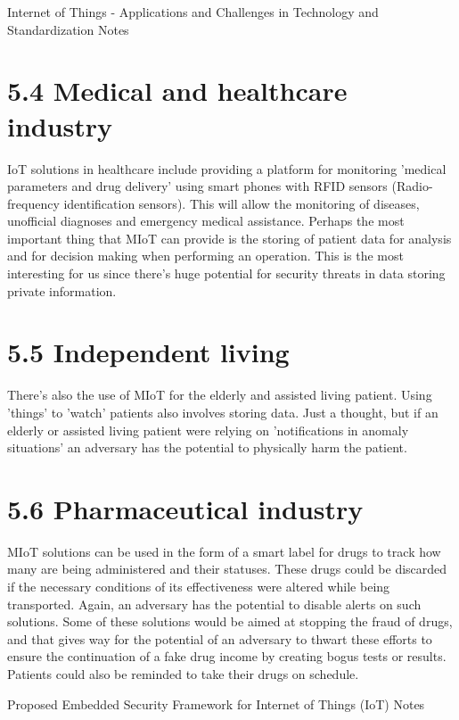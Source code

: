 \documentclass{article}
\begin{document}


\newpage

\newpage


\newpage
\begin{center}
\LARGE Internet of Things - Applications and Challenges in
Technology and Standardization Notes
\end{center}
\section*{5.4 Medical and healthcare industry}
IoT solutions in healthcare include providing a platform for monitoring 'medical parameters and drug delivery' using smart phones with RFID sensors (Radio-frequency identification sensors). This will allow the monitoring of diseases, unofficial diagnoses and emergency medical assistance. Perhaps the most important thing that MIoT can provide is the storing of patient data for analysis and for decision making when performing an operation. This is the most interesting for us since there's huge potential for security threats in data storing private information.

\section*{5.5 Independent living}
There's also the use of MIoT for the elderly and assisted living patient. Using 'things' to 'watch' patients also involves storing data. Just a thought, but if an elderly or assisted living patient were relying on 'notifications in anomaly situations' an adversary has the potential to physically harm the patient.

\section*{5.6 Pharmaceutical industry}
MIoT solutions can be used in the form of a smart label for drugs to track how many are being administered and their statuses. These drugs could be discarded if the necessary conditions of its effectiveness were altered while being transported. Again, an adversary has the potential to disable alerts on such solutions. Some of these solutions would be aimed at stopping the fraud of drugs, and that gives way for the potential of an adversary to thwart these efforts to ensure the continuation of a fake drug income by creating bogus tests or results. Patients could also be reminded to take their drugs on schedule.

\newpage
\begin{center}
\LARGE Proposed Embedded Security Framework for Internet of Things (IoT) Notes
\end{center}
\end{document}
